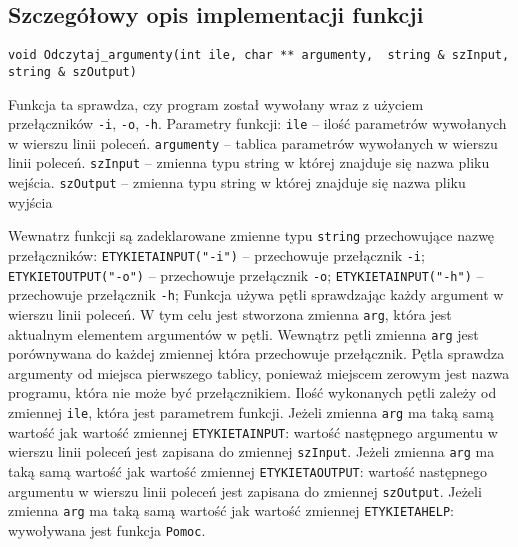 \documentclass[12pt,a4paper]{article}
\begin{document}
\subsection{Szczegółowy opis implementacji funkcji}

\begin{lstlisting}
void Odczytaj_argumenty(int ile, char ** argumenty,  string & szInput, string & szOutput)
\end{lstlisting}
Funkcja ta sprawdza, czy program został wywołany wraz z użyciem przełączników \texttt{-i}, \texttt{-o}, \texttt{-h}.
Parametry funkcji: \newline
\texttt{ile} -- ilość parametrów wywołanych w wierszu linii poleceń. 
\texttt{argumenty} -- tablica parametrów wywołanych w wierszu linii poleceń. \texttt{szInput} -- zmienna typu string w której znajduje się nazwa pliku wejścia. \texttt{szOutput} -- zmienna typu string w której znajduje się nazwa pliku wyjścia \newline

Wewnatrz funkcji są zadeklarowane zmienne typu \lstinline|string| przechowujące nazwę przełączników:
\newline \texttt{ETYKIETAINPUT("-i")} -- przechowuje przełącznik \texttt{-i};
\newline \texttt{ETYKIETOUTPUT("-o")} -- przechowuje przełącznik \texttt{-o};
\newline \texttt{ETYKIETAINPUT("-h")} -- przechowuje przełącznik \texttt{-h};
\newline
Funkcja używa pętli sprawdzając każdy argument w wierszu linii poleceń. W tym celu jest stworzona zmienna \texttt{arg}, która jest aktualnym elementem argumentów w pętli. Wewnątrz pętli zmienna \texttt{arg} jest porównywana do każdej zmiennej która przechowuje przełącznik. Pętla sprawdza argumenty od miejsca pierwszego tablicy, ponieważ miejscem zerowym jest nazwa programu, która nie może być przełącznikiem. Ilość wykonanych pętli zależy od zmiennej \texttt{ile}, która jest parametrem funkcji. Jeżeli zmienna \texttt{arg} ma taką samą wartość jak wartość zmiennej \texttt{ETYKIETAINPUT}: wartość następnego argumentu w wierszu linii poleceń jest zapisana do zmiennej \texttt{szInput}. Jeżeli zmienna \texttt{arg} ma taką samą wartość jak wartość zmiennej \texttt{ETYKIETAOUTPUT}: wartość następnego argumentu w wierszu linii poleceń jest zapisana do zmiennej \texttt{szOutput}. Jeżeli zmienna \texttt{arg} ma taką samą wartość jak wartość zmiennej \texttt{ETYKIETAHELP}: wywoływana jest funkcja \texttt{Pomoc}.
\end{document}
